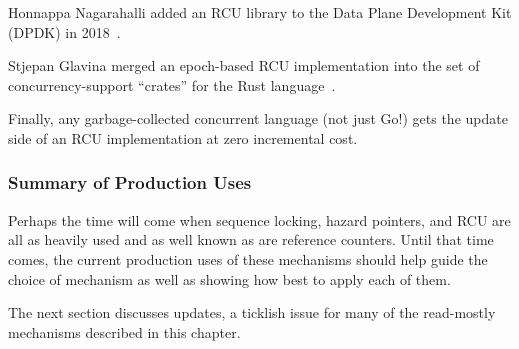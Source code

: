 Honnappa Nagarahalli added an RCU library to the Data Plane Development
Kit (DPDK) in 2018~\cite{HonnappaNagarahalli2018dpdkRCU}.

Stjepan Glavina merged an epoch-based RCU implementation into the
 set of concurrency-support ``crates'' for the Rust
language~\cite{StjepanGlavina2018RustRCU}.

Finally, any garbage-collected concurrent language (not just Go!) gets
the update side of an RCU implementation at zero incremental cost.

\subsubsection{Summary of Production Uses}
\label{sec:defer:Summary of Production Uses}

Perhaps the time will come when sequence locking, hazard pointers, and
RCU are all as heavily used and as well known as are reference counters.
Until that time comes, the current production uses of these mechanisms
should help guide the choice of mechanism as well as showing how best
to apply each of them.

The next section discusses updates, a ticklish issue for many of the
read-mostly mechanisms described in this chapter.
